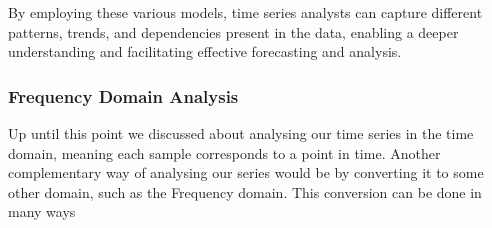 \documentclass[../main.tex]{subfiles}
\begin{document}
        By employing these various models, time series analysts can capture different patterns, trends, and dependencies present in the data, enabling a deeper understanding and facilitating effective forecasting and analysis.
    
    \subsubsection{Frequency Domain Analysis}
        Up until this point we discussed about analysing our time series in the time domain, meaning each sample corresponds to a point in time. Another complementary way of analysing our series would be by converting it to some other domain, such as the Frequency domain. This conversion can be done in many ways    
\end{document}
